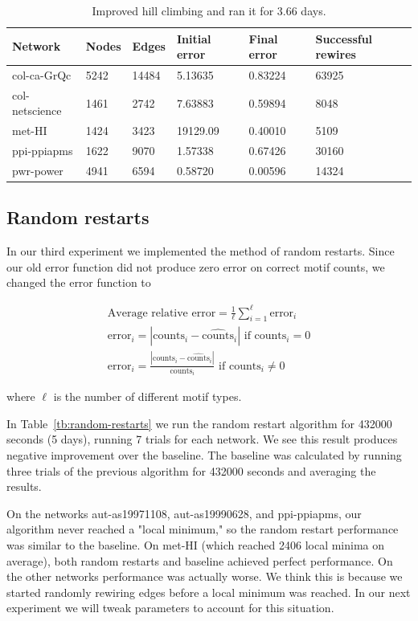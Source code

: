 \begin{table}[t]
\centering
\begin{tabular}{| l | l | l | | l | l | l |}
\hline
Network & Nodes & Edges & Initial error & Final error & Successful rewires\\ \hline
col-ca-GrQc & 5242 & 14484 & 5.13635& 0.83224& 63925 \\\hline
col-netscience & 1461 & 2742 & 7.63883& 0.59894& 8048 \\\hline
met-HI & 1424 & 3423 & 19129.09& 0.40010& 5109 \\\hline
ppi-ppiapms & 1622 & 9070 & 1.57338& 0.67426& 30160 \\\hline
pwr-power & 4941 & 6594 & 0.58720& 0.00596& 14324 \\\hline
\end{tabular}
\caption{Improved hill climbing and ran it for 3.66 days.}
\label{table:errors-exp2}
\end{table}

\subsection{Random restarts}
In our third experiment we implemented the method of random restarts.
Since our old error function did not produce zero error on correct motif
counts, we changed the error function to

\begin{eqnarray}
\label{eqn:newErrorFunction}
\mbox{Average relative error} = \frac{1}{\ell} \sum_{i = 1}^{\ell} \mbox{error}_i\nonumber\\
\mbox{error}_i = |\mbox{counts}_i - \widehat{\mbox{counts}}_i| \mbox{ if counts}_i = 0\\
\mbox{error}_i = \frac{|\mbox{counts}_i - \widehat{\mbox{counts}}_i|}{\mbox{counts}_i} \mbox{ if counts}_i \neq 0\nonumber
\end{eqnarray}

where $\ell$ is the number of different motif types.

In Table~\ref{tb:random-restarts} we run the random restart algorithm for
432000 seconds (5 days), running 7 trials for each network.  We see this 
result produces negative improvement over the baseline.  The baseline was 
calculated by running three trials of the previous algorithm for 432000
seconds and averaging the results.

On the networks aut-as19971108, aut-as19990628, and ppi-ppiapms, our
algorithm never reached a "local minimum," so the random restart performance
was similar to the baseline.  On met-HI (which reached 2406 local minima 
on average), both random restarts and baseline achieved perfect
performance.  On the other networks performance was actually worse.  We
think this is because we started randomly rewiring edges before a local
minimum was reached.  In our next experiment we will tweak parameters to
account for this situation.

